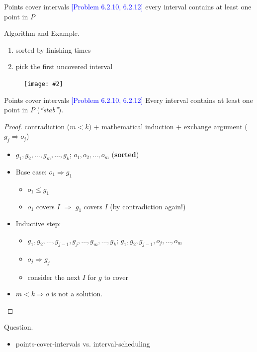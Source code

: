 \documentclass{beamer}
\newcommand{\problemno}[1]{\textcolor{blue}{\scriptsize [Problem #1]}}
\newcommand{\fignocaption}[2]
{
  \begin{figure}[htp]
    \centering
      \texttt{[image: \#2]}
  \end{figure}
}
\begin{document}
\begin{frame}{}
  \begin{block}{Points cover intervals \problemno{6.2.10, 6.2.12}}
    every interval contains at least one point in $P$
  \end{block}

  \begin{block}{Algorithm and Example.}
    \begin{enumerate}
      \item sorted by finishing times
      \item pick the first uncovered interval
    \end{enumerate}
    \fignocaption{width = 0.50\textwidth}{fig/point-cover-interval-example.png}
  \end{block}
\end{frame}
\begin{frame}{}
  \begin{block}{Points cover intervals \problemno{6.2.10, 6.2.12}}
    Every interval contains at least one point in $P$ (\emph{``stab''}).
  \end{block}

  \begin{proof}
    contradiction ($m < k$) + mathematical induction + exchange argument ($g_j
    \Rightarrow o_j$)
    \begin{itemize}
      \item $g_1, g_2, \ldots, g_m, \ldots, g_k$; $o_1, o_2, \ldots, o_m$
      (\textbf{sorted})
      \item Base case: $o_1 \Rightarrow g_1$
        \begin{itemize}
          \item $o_1 \le g_1$
          \item $o_1$ covers $I$ $\Rightarrow$ $g_1$ covers $I$ (by
          contradiction again!)
        \end{itemize}
      \item Inductive step:
		\begin{itemize}
           \item $g_1, g_2, \ldots, g_{j-1}, g_{j}, \ldots, g_m, \ldots, g_k$;
           $g_1, g_2, g_{j-1}, o_{j}, \ldots, o_m$
           \item $o_j \Rightarrow g_j$
           \item consider the next $I$ for $g$ to cover
       \end{itemize}
      \item $m < k \Rightarrow o $ is not a solution.
    \end{itemize}
  \end{proof}

  \begin{alertblock}{Question.}
    \begin{itemize}
      \item points-cover-intervals vs. interval-scheduling
    \end{itemize}
  \end{alertblock}
\end{frame}
\end{document}

